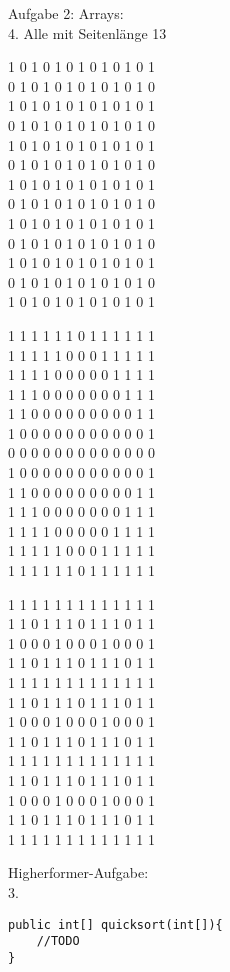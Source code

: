 \documentclass{../../sheet}
\begin{document}
\newpage
{}
Aufgabe 2: Arrays:\\
4. Alle mit Seitenlänge 13
\begin{ausgabe}
1 0 1 0 1 0 1 0 1 0 1 0 1 \\
0 1 0 1 0 1 0 1 0 1 0 1 0 \\
1 0 1 0 1 0 1 0 1 0 1 0 1 \\
0 1 0 1 0 1 0 1 0 1 0 1 0 \\
1 0 1 0 1 0 1 0 1 0 1 0 1 \\
0 1 0 1 0 1 0 1 0 1 0 1 0 \\
1 0 1 0 1 0 1 0 1 0 1 0 1 \\
0 1 0 1 0 1 0 1 0 1 0 1 0 \\
1 0 1 0 1 0 1 0 1 0 1 0 1 \\
0 1 0 1 0 1 0 1 0 1 0 1 0 \\
1 0 1 0 1 0 1 0 1 0 1 0 1 \\
0 1 0 1 0 1 0 1 0 1 0 1 0 \\
1 0 1 0 1 0 1 0 1 0 1 0 1
\end{ausgabe}
\begin{ausgabe}
1 1 1 1 1 1 0 1 1 1 1 1 1 \\
1 1 1 1 1 0 0 0 1 1 1 1 1 \\
1 1 1 1 0 0 0 0 0 1 1 1 1 \\
1 1 1 0 0 0 0 0 0 0 1 1 1 \\
1 1 0 0 0 0 0 0 0 0 0 1 1 \\
1 0 0 0 0 0 0 0 0 0 0 0 1 \\
0 0 0 0 0 0 0 0 0 0 0 0 0 \\
1 0 0 0 0 0 0 0 0 0 0 0 1 \\
1 1 0 0 0 0 0 0 0 0 0 1 1 \\
1 1 1 0 0 0 0 0 0 0 1 1 1 \\
1 1 1 1 0 0 0 0 0 1 1 1 1 \\
1 1 1 1 1 0 0 0 1 1 1 1 1 \\
1 1 1 1 1 1 0 1 1 1 1 1 1
\end{ausgabe}
\begin{ausgabe}
1 1 1 1 1 1 1 1 1 1 1 1 1 \\
1 1 0 1 1 1 0 1 1 1 0 1 1 \\
1 0 0 0 1 0 0 0 1 0 0 0 1 \\
1 1 0 1 1 1 0 1 1 1 0 1 1 \\
1 1 1 1 1 1 1 1 1 1 1 1 1 \\
1 1 0 1 1 1 0 1 1 1 0 1 1 \\
1 0 0 0 1 0 0 0 1 0 0 0 1 \\
1 1 0 1 1 1 0 1 1 1 0 1 1 \\
1 1 1 1 1 1 1 1 1 1 1 1 1 \\
1 1 0 1 1 1 0 1 1 1 0 1 1 \\
1 0 0 0 1 0 0 0 1 0 0 0 1 \\
1 1 0 1 1 1 0 1 1 1 0 1 1 \\
1 1 1 1 1 1 1 1 1 1 1 1 1
\end{ausgabe}

Higherformer-Aufgabe:\\
3.
\begin{verbatim}
public int[] quicksort(int[]){
    //TODO
}
\end{verbatim}
\end{document}
